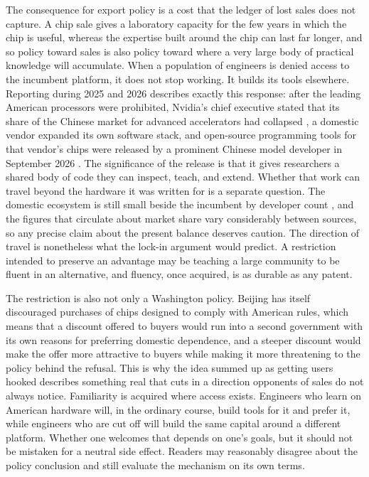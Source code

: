 \documentclass[12pt]{article}
\begin{document}
The consequence for export policy is a cost that the ledger of lost sales does not capture. A chip sale gives a laboratory capacity for the few years in which the chip is useful, whereas the expertise built around the chip can last far longer, and so policy toward sales is also policy toward where a very large body of practical knowledge will accumulate. When a population of engineers is denied access to the incumbent platform, it does not stop working. It builds its tools elsewhere. Reporting during 2025 and 2026 describes exactly this response: after the leading American processors were prohibited, Nvidia's chief executive stated that its share of the Chinese market for advanced accelerators had collapsed \cite{caixin2025}, a domestic vendor expanded its own software stack, and open-source programming tools for that vendor's chips were released by a prominent Chinese model developer in September 2026 \cite{letsdata2026}. The significance of the release is that it gives researchers a shared body of code they can inspect, teach, and extend. Whether that work can travel beyond the hardware it was written for is a separate question. The domestic ecosystem is still small beside the incumbent by developer count \cite{toms2026}, and the figures that circulate about market share vary considerably between sources, so any precise claim about the present balance deserves caution. The direction of travel is nonetheless what the lock-in argument would predict. A restriction intended to preserve an advantage may be teaching a large community to be fluent in an alternative, and fluency, once acquired, is as durable as any patent.

The restriction is also not only a Washington policy. Beijing has itself discouraged purchases of chips designed to comply with American rules, which means that a discount offered to buyers would run into a second government with its own reasons for preferring domestic dependence, and a steeper discount would make the offer more attractive to buyers while making it more threatening to the policy behind the refusal. This is why the idea summed up as getting users hooked describes something real that cuts in a direction opponents of sales do not always notice. Familiarity is acquired where access exists. Engineers who learn on American hardware will, in the ordinary course, build tools for it and prefer it, while engineers who are cut off will build the same capital around a different platform. Whether one welcomes that depends on one's goals, but it should not be mistaken for a neutral side effect. Readers may reasonably disagree about the policy conclusion and still evaluate the mechanism on its own terms.
\end{document}
